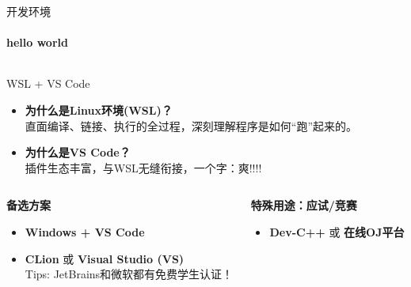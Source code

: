 \documentclass{beamer}
\newcommand{\hrefcol}[2]{\textcolor{cyan}{\href{#1}{#2}}}
\begin{document}
\begin{frame}{开发环境}
\framesubtitle{hello world}

    \begin{columns}[T]
        \begin{column}{0.7\textwidth}
            \huge WSL + VS Code \\
            
            \begin{itemize}
                \item \small \textbf{为什么是Linux环境(WSL)？} \\
                \small 直面\alert{编译、链接、执行}的全过程，深刻理解程序是如何“跑”起来的。
                \item \textbf{为什么是VS Code？} \\
                \small 插件生态丰富，与WSL无缝衔接，一个字：爽!!!!
            \end{itemize}
        \end{column}
        \begin{column}{0.3\textwidth}
            \begin{center}
                \vspace{1cm} %
                \hrefcol{https://code.visualstudio.com/docs/cpp/config-wsl}{\beamergotobutton{官方配置教程}}
            \end{center}
        \end{column}
    \end{columns}
    
    \vspace{0.3cm} %

    \begin{columns}[T]
        \begin{column}{0.5\textwidth}
            \large\textbf{备选方案}
            \begin{itemize}
                \item \textbf{Windows + VS Code} \\
                \item \textbf{CLion} 或 \textbf{Visual Studio (VS)} \\
                \small \alert{Tips: JetBrains和微软都有免费学生认证！}
            \end{itemize}
        \end{column}
        \begin{column}{0.5\textwidth}
            \large\textbf{特殊用途：应试/竞赛} \\
                
                \begin{itemize}
                    \item \textbf{Dev-C++} 或 \textbf{在线OJ平台}
                \end{itemize}
        \end{column}
    \end{columns}
\end{frame}
\end{document}
